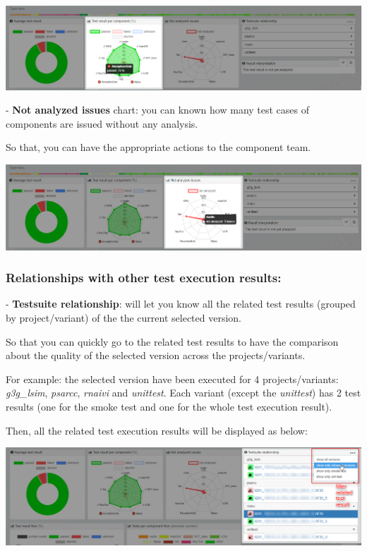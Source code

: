 \includegraphics[width=1\linewidth]
{./pictures/dashboard/chart_test_result_per_component.png}


- \textbf{Not analyzed issues} chart: you can known how many test cases of 
components are issued without any analysis. 

So that, you can have the appropriate actions to the component team.

\includegraphics[width=1\linewidth]
{./pictures/dashboard/chart_not_analyzed_issues.png}

\subsubsection{Relationships with other test execution results:}

- \textbf{Testsuite relationship}: will let you know all the related test 
results (grouped by project/variant) of the the current selected version.

So that you can quickly go to the related test results to have the comparison
about the quality of the selected version across the projects/variants.

For example: the selected version have been executed for 4 projects/variants:
\emph{g3g\_lsim}, \emph{psarcc}, \emph{rnaivi} and \emph{unittest}. Each 
variant (except the \emph{unittest}) has 2 test results 
(one for the smoke test and one for the whole test execution result).

Then, all the related test execution results will be displayed as below:

\includegraphics[width=1\linewidth]
{./pictures/dashboard/testsuite_relationship.png}

